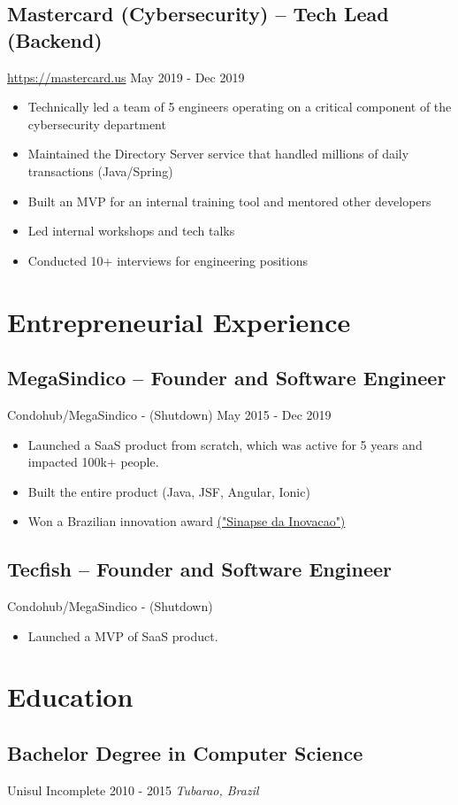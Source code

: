 \documentclass[11pt, a4paper]{article}
\begin{document}
\subsection*{Mastercard (Cybersecurity) -- Tech Lead (Backend)}
\href{https://www.mastercard.us/en-us.html}{https://mastercard.us} \hfill May 2019 - Dec 2019
\begin{itemize}[noitemsep]
    \item Technically led a team of 5 engineers operating on a critical component of the cybersecurity department
    \item Maintained the Directory Server service that handled millions of daily transactions (Java/Spring)
    \item Built an MVP for an internal training tool and mentored other developers
    \item Led internal workshops and tech talks
    \item Conducted 10+ interviews for engineering positions
\end{itemize}

\section*{Entrepreneurial Experience}
\subsection*{MegaSindico -- Founder and Software Engineer}
Condohub/MegaSindico - (Shutdown) \hfill May 2015 - Dec 2019
\begin{itemize}[noitemsep]
    \item Launched a SaaS product from scratch, which was active for 5 years and impacted 100k+ people.
    \item Built the entire product (Java, JSF, Angular, Ionic)
    \item Won a Brazilian innovation award \href{https://certi.org.br/pt/cases-sinapse-da-inovacao}{("Sinapse da Inovacao")}
\end{itemize}

\subsection*{Tecfish -- Founder and Software Engineer}
Condohub/MegaSindico - (Shutdown)
\begin{itemize}[noitemsep]
    \item Launched a MVP of SaaS product.
\end{itemize}

\section*{Education}
\subsection*{Bachelor Degree in Computer Science}
Unisul \hfill Incomplete \hfill 2010 - 2015
\textit{Tubarao, Brazil}
\end{document}
